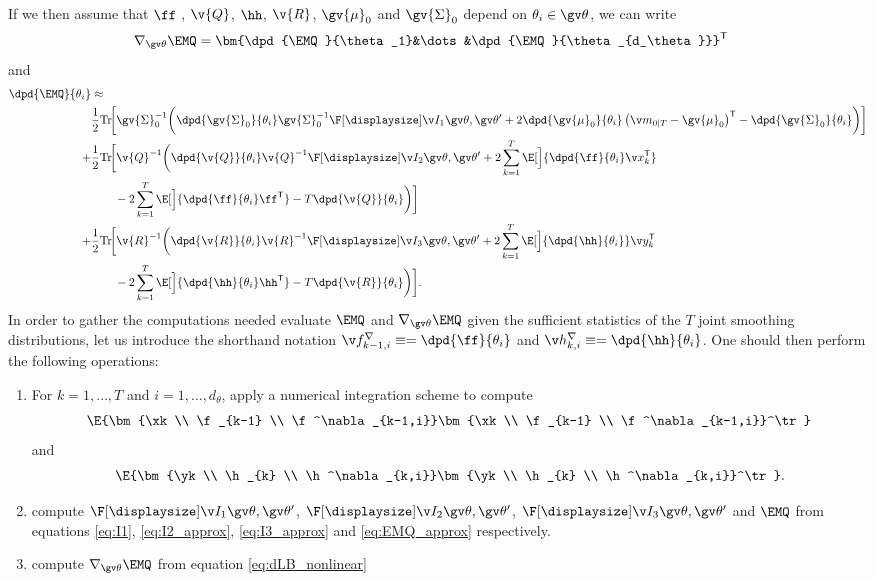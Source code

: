If we then assume
that $\ff$ , $\v{Q}$, $\hh$, $\v{R}$, $\gv{\mu}_0$ and $\gv{\Sigma}_0$ depend on $\theta_i\in\Th$,
we can write
\begin{align}
	\nabla_{\Th}\EMQ &= \bm{\dpd{\EMQ}{\theta_1}&\dots&\dpd{\EMQ}{\theta_{d_\theta}}}^\tr
\end{align}
and
\begin{align}
\label{eq:dLB_nonlinear}
\begin{split}
	\dpd{\EMQ}{\theta_i}&\approx\\
%	
	&\frac{1}{2}\mathrm{Tr}\!\bigg[\gv{\Sigma}_0^{-1}\bigg(
	\dpd{\gv{\Sigma}_0}{\theta_i}\gv{\Sigma}_0^{-1}
	\II{1}
	+2\dpd{\gv{\mu}_0}{\theta_i}\left(\m_{0|T}-\gv{\mu}_0\right)^\tr
	-\dpd{\gv{\Sigma}_0}{\theta_i}\bigg)\bigg]\\
%	
	+&\frac{1}{2}\mathrm{Tr}\!\bigg[\v{Q}^{-1}\bigg(\dpd{\v{Q}}{\theta_i}\v{Q}^{-1}
	\II{2}
	+2\sum_{k=1}^T\E[\Big]{\dpd{\ff}{\theta_i}\x_k^\tr}\\%
	&\qquad-2\sum_{k=1}^T\E[\Big]{\dpd{\ff}{\theta_i}\ff^\tr}
	-T\dpd{\v{Q}}{\theta_i}\bigg)\bigg]\\
%	
	+&\frac{1}{2}\mathrm{Tr}\!\bigg[\v{R}^{-1}\bigg(\dpd{\v{R}}{\theta_i}\v{R}^{-1}
	\II{3}
	+2\sum_{k=1}^T\E[\Big]{\dpd{\hh}{\theta_i}}\y_k^\tr\\
	&\qquad-2\sum_{k=1}^T\E[\Big]{\dpd{\hh}{\theta_i}\hh^\tr}
	-T\dpd{\v{R}}{\theta_i}\bigg)\bigg].
\end{split}	
\end{align}
In order to gather the computations needed evaluate $\EMQ$ and $\nabla_{\Th}\EMQ$ given the sufficient statistics
of the $T$ joint smoothing distributions, let us introduce the shorthand notation $\f^{\nabla}_{k-1,i}\equiv=\dpd{\ff}{\theta_i}$
and  $\h^\nabla_{k,i}\equiv=\dpd{\hh}{\theta_i}$.
One should then
perform the following operations:
\begin{enumerate}
  \item For $k=1,\dots,T$ and $i=1,\dots,d_\theta$, apply a numerical integration scheme to compute
%  
\begin{align}
\E{\bm{\xk \\ \f_{k-1} \\ \f^\nabla_{k-1,i}}\bm{\xk \\ \f_{k-1} \\ \f^\nabla_{k-1,i}}^\tr} 		
\end{align}
and
\begin{align}
\E{\bm{\yk \\ \h_{k} \\ \h^\nabla_{k,i}}\bm{\yk \\ \h_{k} \\ \h^\nabla_{k,i}}^\tr}. 		
\end{align}
\item compute $\II{1}$, $\II{2}$, $\II{3}$ and $\EMQ$ from equations
\eqref{eq:I1}, \eqref{eq:I2_approx}, \eqref{eq:I3_approx} and \eqref{eq:EMQ_approx} respectively.
\item compute $\nabla_{\Th}\EMQ$ from equation \eqref{eq:dLB_nonlinear}
\end{enumerate}


